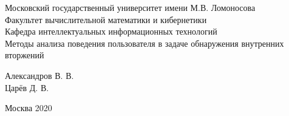 \begin{center} 

\large Московский государственный университет имени М.В. Ломоносова\\
Факультет вычислительной математики и кибернетики\\
Кафедра интеллектуальных информационных технологий\\[5.5cm] 

\huge Методы анализа поведения пользователя в задаче обнаружения внутренних вторжений \\[0.6cm] %


\end{center} 

\begin{flushright}
Александров В. В. \\
Царёв Д. В. \\
\end{flushright}


\vfill 

\begin{center} 
\large Москва 2020
\end{center} 

\thispagestyle{empty}
